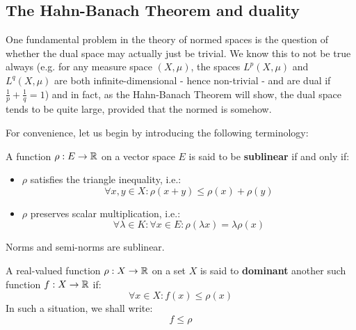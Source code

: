     \subsection{The Hahn-Banach Theorem and duality}
        One fundamental problem in the theory of normed spaces is the question of whether the dual space may actually just be trivial. We know this to not be true always (e.g. for any measure space $(X, \mu)$, the spaces $L^p(X, \mu)$ and $L^q(X, \mu)$ are both infinite-dimensional - hence non-trivial - and are dual if $\frac1p + \frac1q = 1$) and in fact, as the Hahn-Banach Theorem will show, the dual space tends to be quite large, provided that the normed is  somehow.

        For convenience, let us begin by introducing the following terminology:
        \begin{definition}[Sublinearity] \label{def: sublinearity}
            A function $\rho: E \to \mathbb{R}$ on a vector space $E$ is said to be \textbf{sublinear} if and only if:
            \begin{itemize}
                \item $\rho$ satisfies the triangle inequality, i.e.:
                    $$\forall x, y \in X: \rho(x + y) \leq \rho(x) + \rho(y)$$
                \item $\rho$ preserves scalar multiplication, i.e.:
                    $$\forall \lambda \in K: \forall x \in E: \rho(\lambda x) = \lambda \rho(x)$$
            \end{itemize}
        \end{definition}
        \begin{example}
            Norms and semi-norms are sublinear. 
        \end{example}
        \begin{definition}[Dominance] \label{def: dominance}
            A real-valued function $\rho: X \to \mathbb{R}$ on a set $X$ is said to \textbf{dominant} another such function $f: X \to \mathbb{R}$ if:
                $$\forall x \in X: f(x) \leq \rho(x)$$
            In such a situation, we shall write:
                $$f \leq \rho$$
        \end{definition}

